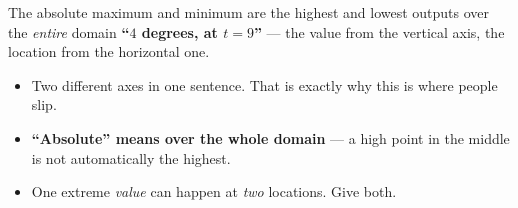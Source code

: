 \documentclass[aspectratio=169, 11pt]{beamer}
\begin{document}
\begin{frame}[t, plain]
  \begin{block}{The absolute maximum and minimum are the highest and lowest outputs over the
    \emph{entire} domain}
    \centering\large
    \textbf{``$4$ degrees, at $t=9$''} --- the value from the vertical axis, the location from the
    horizontal one.
  \end{block}
  \begin{itemize}
    \setlength{\itemsep}{0.28cm}
    \item Two different axes in one sentence. That is exactly why this is where people slip.
    \item \textbf{``Absolute'' means over the whole domain} --- a high point in the middle is not
          automatically the highest.
    \item One extreme \emph{value} can happen at \emph{two} locations. Give both.
  \end{itemize}
\end{frame}
\end{document}
